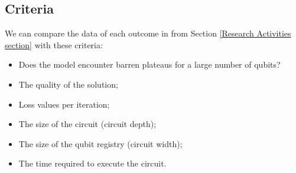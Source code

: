 \subsection{Criteria}
\label{Criteria section}
We can compare the data of each outcome in from Section \ref{Research Activities section} with these criteria:
\begin{itemize}
    \item Does the model encounter barren plateaus for a large number of qubits?
    \item The quality of the solution;
    \item Loss values per iteration;
    \item The size of the circuit (circuit depth);
    \item The size of the qubit registry (circuit width);
    \item The time required to execute the circuit.
\end{itemize}